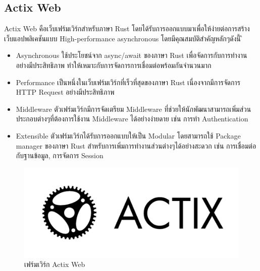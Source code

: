 \subsection{Actix Web}
Actix Web คือเว็บเฟร์มเวิร์กสำหรับภาษา Rust โดยได้รับการออกแบบมาเพื่อให้ง่ายต่อการสร้างเว็บแอปพลิเคชันแบบ High-performance asynchronous โดยมีคุณสมบัติสำคัญหลักๆดังนี้
ิ\begin{itemize}
  \item Asynchronous ใช้ประโยชน์จาก async/await ของภาษา Rust เพื่อจัดการกับการทำงานอย่างมีประสิทธิภาพ ทำให้เหมาะกับการจัดการการเชื่อมต่อพร้อมกันจำนวนมาก
  \item Performance เป็นหนึ่งในเว็บเฟร์มเวิร์กที่เร็วที่สุดของภาษา Rust เนื่องจากมีการจัดการ HTTP Request อย่างมีประสิทธิภาพ
  \item Middleware ตัวเฟร์มเวิร์กมีการจัดเตรียม Middleware ที่ช่วยให้นักพัฒนาสามารถเพิ่มส่วนประกอบต่างๆที่ต้องการใช้งาน Middleware ได้อย่างง่ายดาย เช่น การทำ Authentication
  \item Extensible ตัวเฟร์มเวิร์กได้รับการออกแบบให้เป็น Modular โดยสามารถใช้ Package manager ของภาษา Rust สำหรับการเพิ่มการทำงานส่วนต่างๆได้อย่างสะดวก เช่น การเชื่อมต่อกับฐานข้อมูล, การจัดการ Session
\end{itemize}
\begin{figure}[ht]
  \centering
  \includegraphics[scale=0.1]{images/tech/actix.png}
  \caption{เฟร์มเวิร์ก Actix Web}
  \label{fig:actix}
\end{figure}
\FloatBarrier

